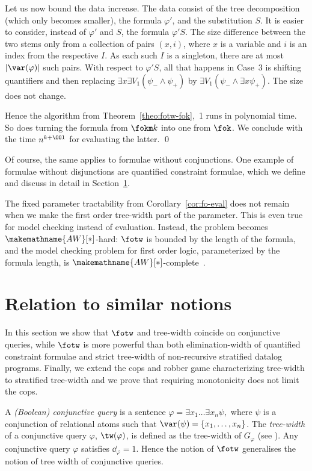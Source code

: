 \documentclass{LMCS}
\newcommand{\gfi}{G_{\varphi}}
\renewcommand{\phi}{\varphi}
\newcommand{\ad}{\dd_{\varphi}}
\begin{document}
Let us now bound the data increase. 
The data consist of the tree decomposition (which only becomes smaller), 
the formula $\phi'$, and the substitution $S$. 
It is easier to consider, instead of $\phi'$ and $S$, the formula $\phi'S$. 
The size difference between the two 
stems only from a collection of pairs $(x,i)$, 
where $x$ is a variable and $i$ is an index from the respective $I$. 
As each such $I$ is a singleton, there are at most $|\var(\phi)|$ such pairs. 
With respect to $\phi'S$, all that happens in Case~3 
is shifting quantifiers 
and then replacing $\exists x\exists V_1(\psi_-\wedge\psi_+)$ 
by $\exists V_1(\psi_-\wedge\exists x\psi_+)$. 
The size does not change. 

Hence the algorithm from Theorem~\ref{theo:fotw-fok},~1 
runs in polynomial time. 
So does turning the formula from $\fokm k$ into one from $\fok$. 
We conclude with the time $n^{k+\OO1}$ for evaluating the latter. 
\qed

Of course, the same applies to formulae without conjunctions. 
One example of formulae without disjunctions 
are quantified constraint formulae, 
which we define and discuss in detail in Section~\ref{section:related-notions}. 

The fixed parameter tractability from Corollary~\ref{cor:fo-eval} 
does not remain when we make the first order tree-width part of the parameter. 
This is even true for model checking instead of evaluation. 
Instead, the problem becomes $\makemathname{AW}[*]$-hard: 
$\fotw$ is bounded by the length of the formula, 
and the model checking problem for first order logic, 
parameterized by the formula length, 
is $\makemathname{AW}[*]$-complete~\cite{DFT1996}. 



\section{Relation to similar notions}\label{section:related-notions}

In this section we show that $\fotw$ and tree-width coincide on conjunctive
queries, while $\fotw$ is more powerful than both elimination-width of 
quantified
constraint formulae and strict tree-width of non-recursive stratified
datalog programs. Finally, we extend the cops and robber game characterizing
tree-width to stratified tree-width and we prove that requiring monotonicity
does not limit the cops.

A \emph{(Boolean) conjunctive query} is a sentence 
$
	\phi=\exists x_1\ldots\exists x_n\psi,
$
where $\psi$ is a conjunction of relational atoms such that
$\var(\psi)=\{x_1,\ldots, x_n\}$. The \emph{tree-width} of a
conjunctive query $\phi$, $\tw(\phi)$, is defined as the tree-width of $\gfi$ 
(see \cite{KolaitisV00}). 
Any conjunctive query $\phi$ satisfies $\ad=1$. Hence the notion of $\fotw$
generalises the notion of tree width of conjunctive queries. 
\end{document}
